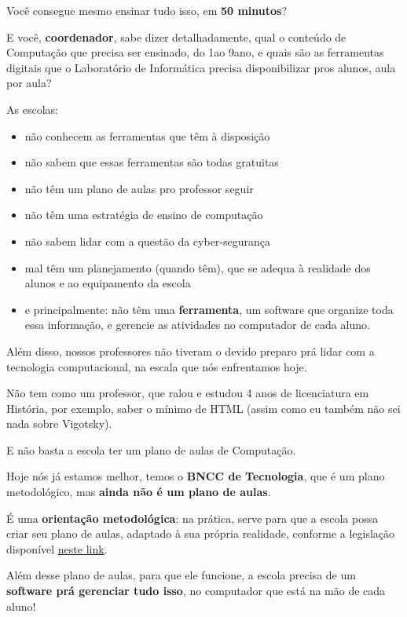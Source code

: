 \begin{multicols}{2}
Você consegue mesmo ensinar tudo isso, em \textbf{50 minutos}?

E você, \textbf{coordenador}, sabe dizer detalhadamente, qual o conteúdo de Computação que precisa ser ensinado, do 1\textordmasculine\space ao 9\textordmasculine\space ano, e quais são as ferramentas digitais que o Laboratório de Informática precisa disponibilizar pros alunos, aula por aula?

As escolas:

\begin{itemize}
	\item não conhecem as ferramentas que têm à disposição
	\item não sabem que essas ferramentas são todas gratuitas
	\item não têm um plano de aulas pro professor seguir
	\item não têm uma estratégia de ensino de computação
	\item não sabem lidar com a questão da cyber-segurança
	\item mal têm um planejamento (quando têm), que se adequa à realidade dos alunos e ao equipamento da escola
 \item e principalmente: não têm uma \textbf{ferramenta}, um software que organize toda essa informação, e gerencie as atividades no computador de cada aluno.
\end{itemize}

Além disso, nossos professores não tiveram o devido preparo prá lidar com a tecnologia computacional, na escala que nós enfrentamos hoje.

Não tem como um professor, que ralou e estudou 4 anos de licenciatura em História, por exemplo, saber o mínimo de HTML (assim como eu também não sei nada sobre Vigotsky).

E não basta a escola ter um plano de aulas de Computação.

Hoje nós já estamos melhor, temos o \textbf{BNCC de Tecnologia}, que é um plano metodológico, mas \textbf{ainda não é um plano de aulas}.

É uma \textbf{orientação metodológica}: na prática, serve para que a escola possa criar seu plano de aulas, adaptado à sua própria realidade, conforme a legislação disponível \href{http://portal.mec.gov.br/index.php?option=com_docman&view=download&alias=241671-rceb001-22&category_slug=outubro-2022-pdf&Itemid=30192}{neste link}.

Além desse plano de aulas, para que ele funcione, a escola precisa de um \textbf{software prá gerenciar tudo isso}, no computador que está na mão de cada aluno!


\end{multicols}
